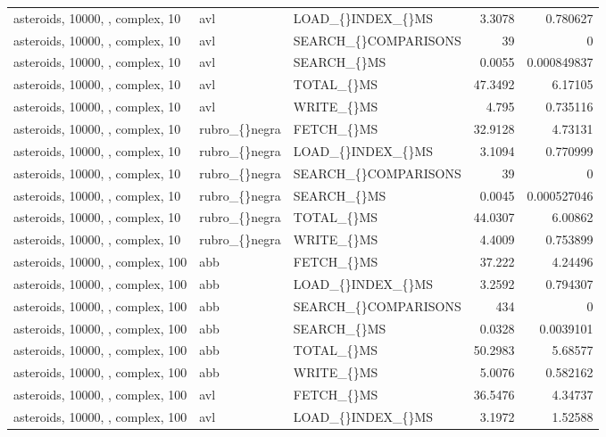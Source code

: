 \begin{longtable}{p{4cm}p{1.4cm}p{2.6cm}rr}
asteroids, 10000, , complex, 10 & avl & LOAD\_\allowbreak\{\}INDEX\_\allowbreak\{\}MS & 3.3078 & 0.780627\\
asteroids, 10000, , complex, 10 & avl & SEARCH\_\allowbreak\{\}COMPARISONS & 39 & 0\\
asteroids, 10000, , complex, 10 & avl & SEARCH\_\allowbreak\{\}MS & 0.0055 & 0.000849837\\
asteroids, 10000, , complex, 10 & avl & TOTAL\_\allowbreak\{\}MS & 47.3492 & 6.17105\\
asteroids, 10000, , complex, 10 & avl & WRITE\_\allowbreak\{\}MS & 4.795 & 0.735116\\
asteroids, 10000, , complex, 10 & rubro\_\allowbreak\{\}negra & FETCH\_\allowbreak\{\}MS & 32.9128 & 4.73131\\
asteroids, 10000, , complex, 10 & rubro\_\allowbreak\{\}negra & LOAD\_\allowbreak\{\}INDEX\_\allowbreak\{\}MS & 3.1094 & 0.770999\\
asteroids, 10000, , complex, 10 & rubro\_\allowbreak\{\}negra & SEARCH\_\allowbreak\{\}COMPARISONS & 39 & 0\\
asteroids, 10000, , complex, 10 & rubro\_\allowbreak\{\}negra & SEARCH\_\allowbreak\{\}MS & 0.0045 & 0.000527046\\
asteroids, 10000, , complex, 10 & rubro\_\allowbreak\{\}negra & TOTAL\_\allowbreak\{\}MS & 44.0307 & 6.00862\\
asteroids, 10000, , complex, 10 & rubro\_\allowbreak\{\}negra & WRITE\_\allowbreak\{\}MS & 4.4009 & 0.753899\\
asteroids, 10000, , complex, 100 & abb & FETCH\_\allowbreak\{\}MS & 37.222 & 4.24496\\
asteroids, 10000, , complex, 100 & abb & LOAD\_\allowbreak\{\}INDEX\_\allowbreak\{\}MS & 3.2592 & 0.794307\\
asteroids, 10000, , complex, 100 & abb & SEARCH\_\allowbreak\{\}COMPARISONS & 434 & 0\\
asteroids, 10000, , complex, 100 & abb & SEARCH\_\allowbreak\{\}MS & 0.0328 & 0.0039101\\
asteroids, 10000, , complex, 100 & abb & TOTAL\_\allowbreak\{\}MS & 50.2983 & 5.68577\\
asteroids, 10000, , complex, 100 & abb & WRITE\_\allowbreak\{\}MS & 5.0076 & 0.582162\\
asteroids, 10000, , complex, 100 & avl & FETCH\_\allowbreak\{\}MS & 36.5476 & 4.34737\\
asteroids, 10000, , complex, 100 & avl & LOAD\_\allowbreak\{\}INDEX\_\allowbreak\{\}MS & 3.1972 & 1.52588\\

\end{longtable}
